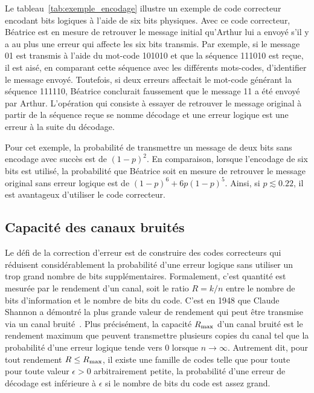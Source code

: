 Le tableau~\ref{tab:exemple_encodage} illustre un exemple de code correcteur
encodant  bits logiques à l'aide de six bits physiques.
Avec ce code correcteur,
Béatrice est en mesure de retrouver le message initial qu'Arthur lui a
envoyé s'il y a au plus une erreur qui affecte les six bits transmis. 
Par exemple, si le message 01 est transmis à l'aide du mot-code 
101010 et que la séquence 111010 est reçue, 
il est aisé, en comparant cette séquence avec les différents 
mots-codes, d'identifier le message envoyé. 
Toutefois, 
si deux erreurs affectait le mot-code générant la séquence 111110, 
Béatrice conclurait faussement que le message 11 a été envoyé par Arthur.
L'opération qui consiste à essayer de retrouver le message original à partir
de la séquence reçue se nomme décodage 
et une erreur logique est une erreur à la suite du décodage.

Pour cet exemple,
la probabilité de transmettre un message de deux bits sans encodage avec succès 
est de $(1 - p)^2$. 
En comparaison,
lorsque l'encodage de six bits est utilisé, 
la probabilité que Béatrice soit en mesure de retrouver le message original 
sans erreur logique est de $(1 - p)^6 + 6p(1 - p)^5$.
Ainsi, si $p \lesssim 0.22$, il est avantageux d'utiliser le code correcteur.

\subsection{Capacité des canaux bruités}

Le défi de la correction d'erreur est de construire des codes correcteurs 
qui réduisent considérablement la probabilité d'une erreur logique sans utiliser 
un trop grand nombre de bits supplémentaires.
Formalement,
c'est quantité est mesurée par le rendement d'un canal, 
soit le ratio $R = k/n$ entre le nombre de bits d'information et le 
nombre de bits du code. 
C'est en 1948 que Claude Shannon a démontré la plus grande valeur 
de rendement qui peut être transmise via un canal bruité~\cite{shannon_mathematical_1948}.
Plus précisément,
la capacité $R_{\text{max}}$ d'un canal bruité est le rendement maximum 
que peuvent transmettre plusieurs copies du canal tel que la probabilité d'une 
erreur logique tende vers 0 lorsque $n \to \infty$.
Autrement dit,
pour tout rendement $R \leq R_{\text{max}} $, 
il existe une famille de codes 
telle que pour toute pour toute valeur $\epsilon > 0$ arbitrairement petite, 
la probabilité d'une erreur de décodage est inférieure à $\epsilon$ si le 
nombre de bits du code est assez grand.

